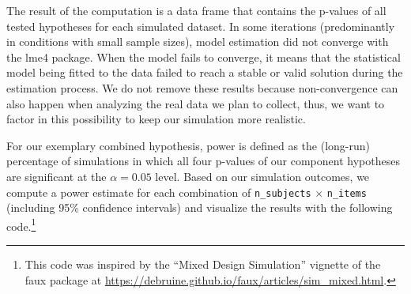 \documentclass[
  man,floatsintext]{apa6}
\begin{document}
The result of the computation is a data frame that contains the p-values of all tested hypotheses for each simulated dataset.
In some iterations (predominantly in conditions with small sample sizes), model estimation did not converge with the lme4 package. When the model fails to converge, it means that the statistical model being fitted to the data failed to reach a stable or valid solution during the estimation process. We do not remove these results because non-convergence can also happen when analyzing the real data we plan to collect, thus, we want to factor in this possibility to keep our simulation more realistic.

For our exemplary combined hypothesis, power is defined as the (long-run) percentage of simulations in which all four p-values of our component hypotheses are significant at the \(\alpha = 0.05\) level. Based on our simulation outcomes, we compute a power estimate for each combination of \texttt{n\_subjects} \(\times\) \texttt{n\_items} (including 95\% confidence intervals) and visualize the results with the following code.\footnote{This code was inspired by the ``Mixed Design Simulation'' vignette of the faux package at \url{https://debruine.github.io/faux/articles/sim_mixed.html}.}
\end{document}
